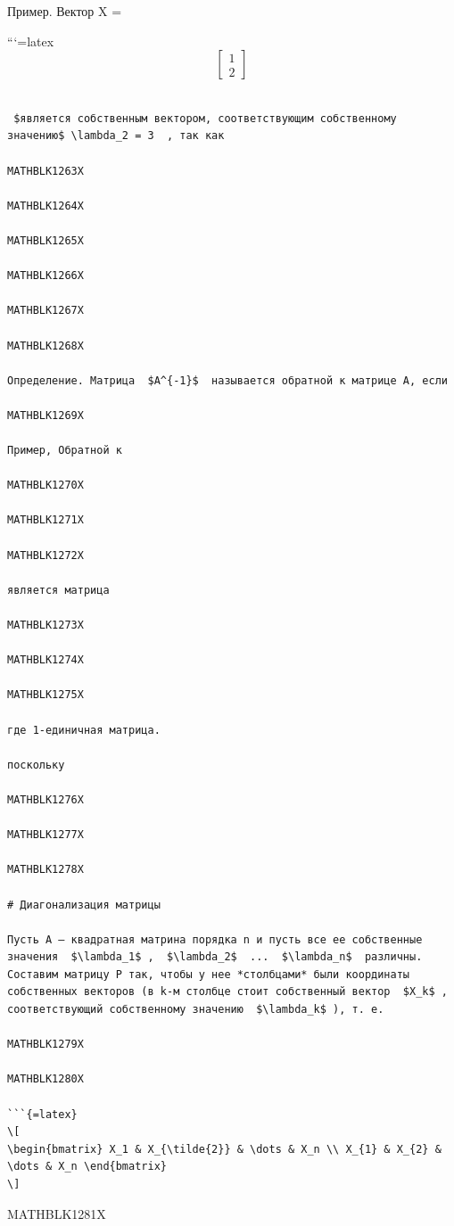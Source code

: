 \documentclass[
]{article}
\begin{document}
Пример. Вектор X =

```{=latex}
\[
\begin{bmatrix} 1 \\ 2 \end{bmatrix}
\]

\begin{verbatim}

 $является собственным вектором, соответствующим собственному значению$ \lambda_2 = 3  , так как

MATHBLK1263X

MATHBLK1264X

MATHBLK1265X

MATHBLK1266X

MATHBLK1267X

MATHBLK1268X

Определение. Матрица  $A^{-1}$  называется обратной к матрице A, если

MATHBLK1269X

Пример, Обратной к

MATHBLK1270X

MATHBLK1271X

MATHBLK1272X

является матрица

MATHBLK1273X

MATHBLK1274X

MATHBLK1275X

где 1-единичная матрица.

поскольку

MATHBLK1276X

MATHBLK1277X

MATHBLK1278X

# Диагонализация матрицы

Пусть A — квадратная матрина порядка n и пусть все ее собственные значения  $\lambda_1$ ,  $\lambda_2$  ...  $\lambda_n$  различны. Составим матрицу P так, чтобы у нее *столбцами* были координаты собственных векторов (в k-м столбце стоит собственный вектор  $X_k$ , соответствующий собственному значению  $\lambda_k$ ), т. е.

MATHBLK1279X

MATHBLK1280X

```{=latex}
\[
\begin{bmatrix} X_1 & X_{\tilde{2}} & \dots & X_n \\ X_{1} & X_{2} & \dots & X_n \end{bmatrix}
\]
\end{verbatim}

MATHBLK1281X
\end{document}
